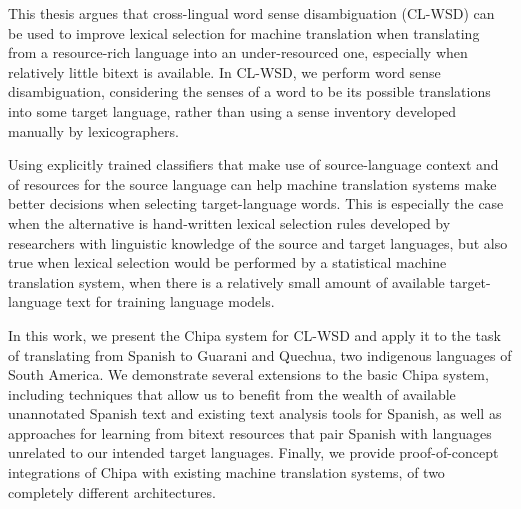 This thesis argues that cross-lingual word sense disambiguation (CL-WSD) can be
used to improve lexical selection for machine translation when translating from
a resource-rich language into an under-resourced one, especially when relatively
little bitext is available.  In CL-WSD, we perform word sense disambiguation,
considering the senses of a word to be its possible translations into some
target language, rather than using a sense inventory developed manually by
lexicographers.

Using explicitly trained classifiers that make use of source-language context
and of resources for the source language can help machine translation systems
make better decisions when selecting target-language words. This is especially
the case when the alternative is hand-written lexical selection rules developed
by researchers with linguistic knowledge of the source and target languages, but
also true when lexical selection would be performed by a statistical machine
translation system, when there is a relatively small amount of available
target-language text for training language models.

In this work, we present the Chipa system for CL-WSD and apply it to the task of
translating from Spanish to Guarani and Quechua, two indigenous languages of
South America. We demonstrate several extensions to the basic Chipa system,
including techniques that allow us to benefit from the wealth of available
unannotated Spanish text and existing text analysis tools for Spanish, as well
as approaches for learning from bitext resources that pair Spanish with
languages unrelated to our intended target languages. Finally, we provide
proof-of-concept integrations of Chipa with existing machine translation
systems, of two completely different architectures.
